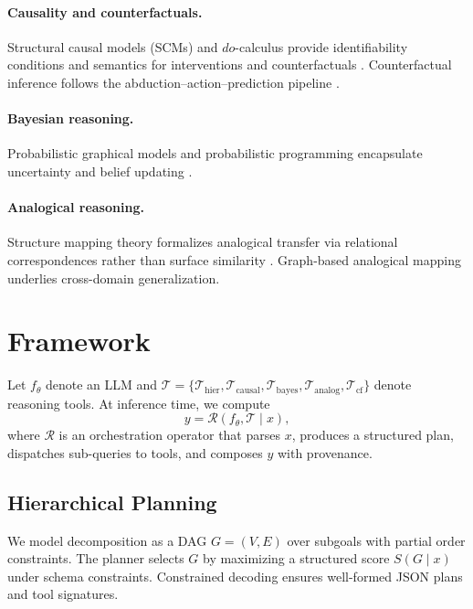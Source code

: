 \documentclass[11pt]{article}
\begin{document}
\paragraph{Causality and counterfactuals.}
Structural causal models (SCMs) and $do$-calculus provide identifiability conditions and semantics for interventions and counterfactuals \citep{pearl2009causality, peters2017elements}. Counterfactual inference follows the abduction--action--prediction pipeline \citep{pearl2009causality}.
\paragraph{Bayesian reasoning.}
Probabilistic graphical models and probabilistic programming encapsulate uncertainty and belief updating \citep{gelman2013bayesian, koller2009pgm}.
\paragraph{Analogical reasoning.}
Structure mapping theory formalizes analogical transfer via relational correspondences rather than surface similarity \citep{gentner1983structure, falkenhainer1989structure}. Graph-based analogical mapping underlies cross-domain generalization.

\section{Framework}
Let $f_\theta$ denote an LLM and $\mathcal{T}=\{\mathcal{T}_\mathrm{hier},\mathcal{T}_\mathrm{causal},\mathcal{T}_\mathrm{bayes},\mathcal{T}_\mathrm{analog},\mathcal{T}_\mathrm{cf}\}$ denote reasoning tools.
At inference time, we compute
\begin{equation}
y = \mathcal{R}\!\left(f_\theta, \mathcal{T} \mid x\right),
\end{equation}
where $\mathcal{R}$ is an orchestration operator that parses $x$, produces a structured plan, dispatches sub-queries to tools, and composes $y$ with provenance.

\subsection{Hierarchical Planning}
We model decomposition as a DAG $G=(V,E)$ over subgoals with partial order constraints. The planner selects $G$ by maximizing a structured score $S(G\mid x)$ under schema constraints. Constrained decoding \citep{anderson2023guidance} ensures well-formed JSON plans and tool signatures.
\end{document}
